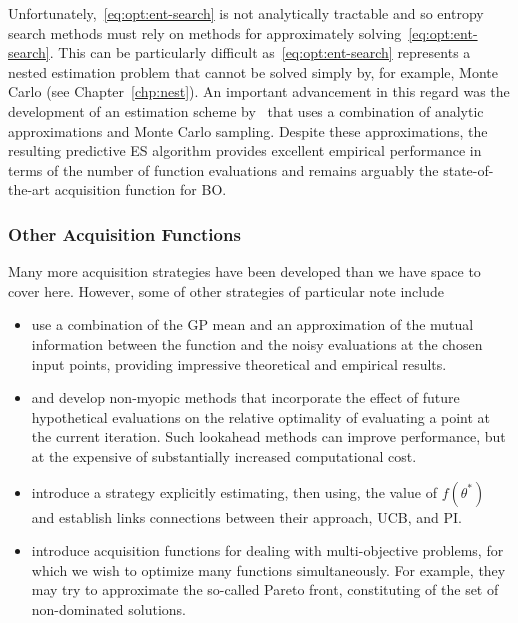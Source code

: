 Unfortunately,~\eqref{eq:opt:ent-search} is not analytically tractable and so entropy
search methods must rely on methods for approximately solving~\eqref{eq:opt:ent-search}.  
This can be particularly difficult as~\eqref{eq:opt:ent-search} represents a nested estimation
problem that cannot be solved simply by, for example, Monte Carlo (see Chapter~\ref{chp:nest}).
An important advancement in this regard was the development of an estimation scheme
by~\cite{hernandez2014predictive} that uses a combination of analytic approximations
and Monte Carlo sampling.  Despite these approximations, the resulting predictive ES algorithm
provides excellent empirical performance in terms of the number of function 
evaluations and remains arguably the state-of-the-art acquisition function for BO.

\subsubsection{Other Acquisition Functions}
\label{sec:opt:BO:acq:other}

Many more acquisition strategies have been developed than we have space 
to cover here.  However, some of other strategies of particular note include
\begin{itemize}
		\setlength\itemsep{0em}
	\item \cite{contal2014gaussian} use a combination
	of the GP mean and an approximation of the mutual information between the
	function and the noisy evaluations at the chosen input points, providing impressive
	theoretical and empirical results.
	\item \cite{osborne2009gaussian} and \cite{gonzalez2016glasses} develop
	non-myopic methods that incorporate the effect of future hypothetical evaluations on
	the relative optimality of evaluating a point at the current iteration.  Such lookahead methods
	can improve performance, but at the expensive of substantially increased computational cost.
	\item \cite{wang2016optimization} introduce a strategy explicitly estimating, then using,
	the value of $f(\theta^*)$ and establish links connections between their
	approach, UCB, and PI.
	\item \cite{swersky2013multi,shah2016pareto,hernandez2016predictive,feliot2017bayesian}
	introduce acquisition functions for dealing with multi-objective problems, for which we
	wish to optimize many functions simultaneously.  For example, they may try to approximate
	the so-called Pareto front, constituting of the set of non-dominated solutions.
\end{itemize}

